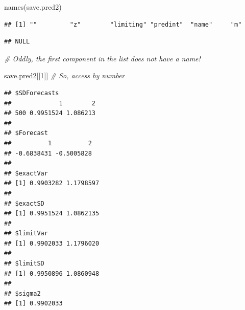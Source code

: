 \documentclass[
]{book}
\newenvironment{Shaded}{\begin{snugshade}}{\end{snugshade}}
\newcommand{\CommentTok}[1]{\textcolor[rgb]{0.56,0.35,0.01}{\textit{#1}}}
\newcommand{\DecValTok}[1]{\textcolor[rgb]{0.00,0.00,0.81}{#1}}
\newcommand{\FunctionTok}[1]{\textcolor[rgb]{0.00,0.00,0.00}{#1}}
\newcommand{\NormalTok}[1]{#1}
\newcommand{\SpecialCharTok}[1]{\textcolor[rgb]{0.00,0.00,0.00}{#1}}
\newcommand{\StringTok}[1]{\textcolor[rgb]{0.31,0.60,0.02}{#1}}
\theoremstyle{definition}
\theoremstyle{definition}
\theoremstyle{definition}
\theoremstyle{definition}
\theoremstyle{remark}
\begin{document}
\begin{Shaded}
\begin{Highlighting}[]
\FunctionTok{names}\NormalTok{(save.pred2)}
\end{Highlighting}
\end{Shaded}

\begin{verbatim}
## [1] ""         "z"        "limiting" "predint"  "name"     "m"
\end{verbatim}

\begin{Shaded}
\end{Shaded}

\begin{verbatim}
## NULL
\end{verbatim}

\begin{Shaded}
\begin{Highlighting}[]
\CommentTok{\# Oddly, the first component in the list does not have a name!}
\end{Highlighting}
\end{Shaded}

\begin{Shaded}
\begin{Highlighting}[]
\NormalTok{save.pred2[[}\DecValTok{1}\NormalTok{]]  }\CommentTok{\# So, access by number}
\end{Highlighting}
\end{Shaded}

\begin{verbatim}
## $SDForecasts
##             1        2
## 500 0.9951524 1.086213
## 
## $Forecast
##          1          2 
## -0.6838431 -0.5005828 
## 
## $exactVar
## [1] 0.9903282 1.1798597
## 
## $exactSD
## [1] 0.9951524 1.0862135
## 
## $limitVar
## [1] 0.9902033 1.1796020
## 
## $limitSD
## [1] 0.9950896 1.0860948
## 
## $sigma2
## [1] 0.9902033
\end{verbatim}
\end{document}
